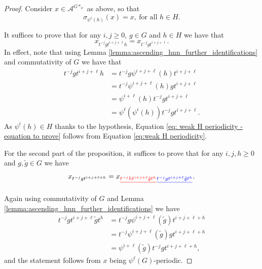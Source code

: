 \documentclass[cupthm,crop,info]{CUP-JNL-ETS}%
\theoremstyle{cupplain}
\newtheorem{proposition}[theorem]{Proposition}
\theoremstyle{cupdefinition}
\theoremstyle{cupremark}
\theoremstyle{cupproof}
\newtheorem{proof}{Proof}
\numberwithin{equation}{section}
\newcommand{\BS}[1][N]{\mathrm{BS}(1,#1)}
\providecommand{\DIFadd}[1]{{\protect\color{blue}\uwave{#1}}} %
\providecommand{\DIFdel}[1]{{\protect\color{red}\sout{#1}}}                      %
\providecommand{\DIFaddbegin}{} %
\providecommand{\DIFaddend}{} %
\providecommand{\DIFdelbegin}{} %
\providecommand{\DIFdelend}{} %
\newcommand{\DIFscaledelfig}{0.5}
\newlength{\DIFdelgraphicswidth} %
\newlength{\DIFdelgraphicsheight} %
\newcommand{\DIFaddincludegraphics}[2][]{{\color{blue}\fbox{\DIFOincludegraphics[#1]{#2}}}} %
\newcommand{\DIFdelincludegraphics}[2][]{%
\sbox{\DIFdelgraphicsbox}{\DIFOincludegraphics[#1]{#2}}%
\settoboxwidth{\DIFdelgraphicswidth}{\DIFdelgraphicsbox} %
\settoboxtotalheight{\DIFdelgraphicsheight}{\DIFdelgraphicsbox} %
\scalebox{\DIFscaledelfig}{%
\parbox[b]{\DIFdelgraphicswidth}{\usebox{\DIFdelgraphicsbox}\\[-\baselineskip] \rule{\DIFdelgraphicswidth}{0em}}\llap{\resizebox{\DIFdelgraphicswidth}{\DIFdelgraphicsheight}{%
\setlength{\unitlength}{\DIFdelgraphicswidth}%
\begin{picture}(1,1)%
\thicklines\linethickness{2pt} %
{\color[rgb]{1,0,0}\put(0,0){\framebox(1,1){}}}%
{\color[rgb]{1,0,0}\put(0,0){\line( 1,1){1}}}%
{\color[rgb]{1,0,0}\put(0,1){\line(1,-1){1}}}%
\end{picture}%
}\hspace*{3pt}}} %
} %
\DeclareRobustCommand{\DIFaddbegin}{\DIFOaddbegin \let\includegraphics\DIFaddincludegraphics} %
\DeclareRobustCommand{\DIFaddend}{\DIFOaddend \let\includegraphics\DIFOincludegraphics} %
\DeclareRobustCommand{\DIFdelbegin}{\DIFOdelbegin \let\includegraphics\DIFdelincludegraphics} %
\DeclareRobustCommand{\DIFdelend}{\DIFOaddend \let\includegraphics\DIFOincludegraphics} %
\begin{document}
\begin{proof}
	Consider $x\in \mathcal{A}^{G*_{\psi}}$ as above, so that
	\begin{equation}\label{eq:weak H periodicity}
	\sigma_{\psi^{\ell}(h)}(x)=x,\ \text{for all }h\in H.
	\end{equation}

	It suffices to prove that for any $i,j\ge 0$, $g\in G$ and $h\in H$ we have that
	\begin{equation}\label{eq: weak H periodicity - equation to prove}
	x_{t^{-j}gt^{i+j+\ell}h}=x_{t^{-j}gt^{i+j+\ell}}.
	\end{equation}
	In effect, note that using Lemma \ref{lemma:ascending_hnn_further_identifications} and commutativity of $G$ we have that
	\begin{align*}
	t^{-j}gt^{i+j+\ell}h&=t^{-j}g\psi^{i+j+\ell}(h)t^{i+j+\ell}	\\
	&=t^{-j}\psi^{i+j+\ell}(h)gt^{i+j+\ell}	\\
	&=\psi^{i+\ell}(h)t^{-j}gt^{i+j+\ell}\\
	&=\psi^{\ell}(\psi^i(h))t^{-j}gt^{i+j+\ell}.
	\end{align*}
	As $\psi^i(h)\in H$ thanks to the hypothesis, Equation \eqref{eq: weak H periodicity - equation to prove} follows from Equation  \eqref{eq:weak H periodicity}.

	
	For the second part of the proposition, it suffices to prove that for any $i,j,h\ge 0$ and $g,\tilde{g}\in G$ we have
	$$
	x_{t^{-j}gt^{i+j+\ell+h}}=x\DIFdelbegin \DIFdel{_{t^{-j}ht^{i+j+\ell}\tilde{g}t^h}}\DIFdelend \DIFaddbegin \DIFadd{_{t^{-j}gt^{i+j+\ell}\tilde{g}t^h}}\DIFaddend .
	$$

	Again using commutativity of $G$ and Lemma \ref{lemma:ascending_hnn_further_identifications} we have
	\begin{align*}
	t^{-j}gt^{i+j+\ell}\DIFaddbegin \tilde{g}\DIFaddend t^h&=t^{-j}g\psi^{i+j+\ell}(\tilde{g})t^{i+j+\ell+h}\\
	&=t^{-j}\psi^{i+j+\ell}(\tilde{g})gt^{i+j+\ell+h}\\
	&=\psi^{i+\ell}(\tilde{g})t^{-j}gt^{i+j+\ell+h},
	\end{align*}
	and the statement follows from $x$ being $\psi^{\ell}(G)$-periodic.
\end{proof}
%	
%	
\end{document}
